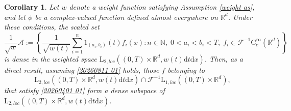 \documentclass[11pt,reqno]{amsart}
\newtheorem{corollary}[thm]{Corollary}
\theoremstyle{definition}
\theoremstyle{remark}
\newcommand\bN{\mathbb{N}}
\newcommand\bR{\mathbb{R}}
\newcommand\cA{\mathcal{A}}
\newcommand\cF{\mathcal{F}}
\numberwithin{equation}{section}
\begin{document}
\begin{corollary}
									\label{dense cor}
Let $w$ denote a weight function satisfying Assumption \ref{weight as}, and let $\phi$ be a complex-valued function defined almost everywhere on $\bR^d$. 
Under these conditions, the scaled set
$$
\frac{1}{\sqrt{w}} \cA := \left\{ \frac{1}{\sqrt{w(t)}} \sum_{i=1}^n 1_{(a_i,b_i)}(t) f_i(x) : n \in \bN, \; 0 < a_i < b_i < T, \; f_i \in \cF^{-1}\mathrm{C}_c^\infty(\bR^d) \right\}
$$
is dense in the weighted space $\mathrm{L}_{2,loc}\left( (0,T) \times \bR^d, w(t)\mathrm{d}t\mathrm{d}x \right)$.
Then, as a direct result, assuming \eqref{20260811 01} holds, those $f$ belonging to
 $$
\mathrm{L}_{2,loc}\left( (0,T) \times \bR^d, w(t)\mathrm{d}t \mathrm{d}x \right)\cap \cF^{-1}\mathrm{L}_{1,loc}\left( (0,T) \times \bR^d \right), 
$$ 
that satisfy \eqref{20260401 01} form a dense subspace of $\mathrm{L}_{2,loc}\left( (0,T) \times \bR^d, w(t)\mathrm{d}t\mathrm{d}x \right)$.
\end{corollary}
\end{document}
